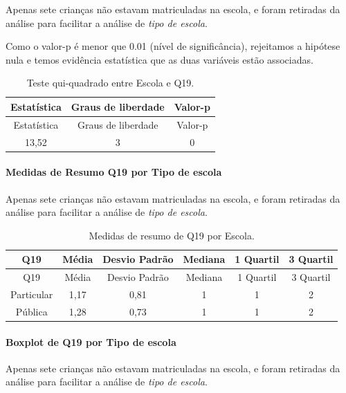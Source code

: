 \documentclass[]{article}
\let\oldparagraph\paragraph
\renewcommand{\paragraph}[1]{\oldparagraph{#1}\mbox{}}
\begin{document}
Apenas sete crianças não estavam matriculadas na escola, e foram retiradas da análise para facilitar a análise de \emph{tipo de escola}.

Como o valor-p é menor que 0.01 (nível de significância), rejeitamos a hipótese nula e temos evidência estatística que as duas variáveis estão associadas.

\begin{longtable}[]{@{}ccc@{}}
\caption{\label{tab:unnamed-chunk-351}Teste qui-quadrado entre Escola e Q19.}\tabularnewline
\toprule
Estatística & Graus de liberdade & Valor-p\tabularnewline
\midrule
\endfirsthead
\toprule
Estatística & Graus de liberdade & Valor-p\tabularnewline
\midrule
\endhead
13,52 & 3 & 0\tabularnewline
\bottomrule
\end{longtable}

\cleardoublepage

\hypertarget{medidas-de-resumo-q19-por-tipo-de-escola}{%
\paragraph{Medidas de Resumo Q19 por Tipo de escola}\label{medidas-de-resumo-q19-por-tipo-de-escola}}

Apenas sete crianças não estavam matriculadas na escola, e foram retiradas da análise para facilitar a análise de \emph{tipo de escola}.

\begin{longtable}[]{@{}cccccc@{}}
\caption{\label{tab:unnamed-chunk-352}Medidas de resumo de Q19 por Escola.}\tabularnewline
\toprule
Q19 & Média & Desvio Padrão & Mediana & 1 Quartil & 3 Quartil\tabularnewline
\midrule
\endfirsthead
\toprule
Q19 & Média & Desvio Padrão & Mediana & 1 Quartil & 3 Quartil\tabularnewline
\midrule
\endhead
Particular & 1,17 & 0,81 & 1 & 1 & 2\tabularnewline
Pública & 1,28 & 0,73 & 1 & 1 & 2\tabularnewline
\bottomrule
\end{longtable}

\hypertarget{boxplot-de-q19-por-tipo-de-escola}{%
\paragraph{Boxplot de Q19 por Tipo de escola}\label{boxplot-de-q19-por-tipo-de-escola}}

Apenas sete crianças não estavam matriculadas na escola, e foram retiradas da análise para facilitar a análise de \emph{tipo de escola}.
\end{document}
